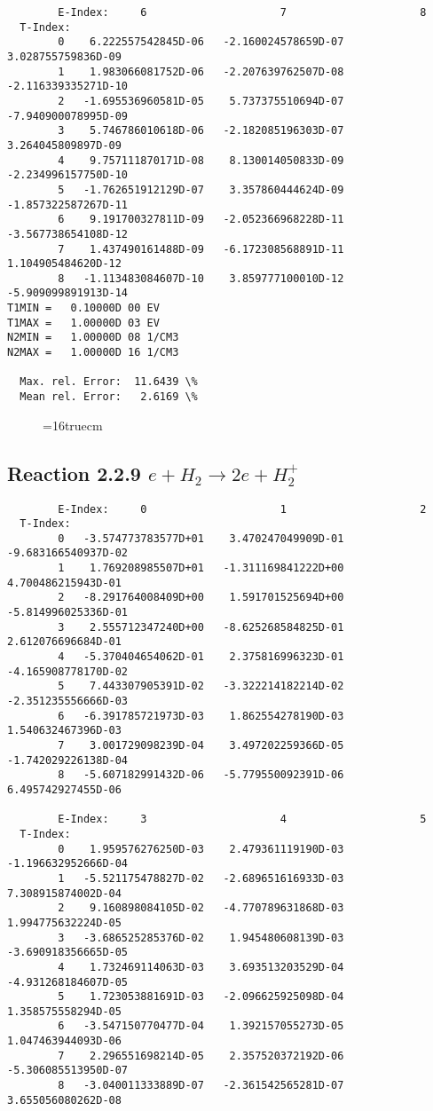 \documentclass[12pt,dvipdfmx]{article}
\begin{document}
{\begin{small}
\begin{verbatim}
        E-Index:     6                     7                     8
  T-Index:
        0    6.222557542845D-06   -2.160024578659D-07    3.028755759836D-09
        1    1.983066081752D-06   -2.207639762507D-08   -2.116339335271D-10
        2   -1.695536960581D-05    5.737375510694D-07   -7.940900078995D-09
        3    5.746786010618D-06   -2.182085196303D-07    3.264045809897D-09
        4    9.757111870171D-08    8.130014050833D-09   -2.234996157750D-10
        5   -1.762651912129D-07    3.357860444624D-09   -1.857322587267D-11
        6    9.191700327811D-09   -2.052366968228D-11   -3.567738654108D-12
        7    1.437490161488D-09   -6.172308568891D-11    1.104905484620D-12
        8   -1.113483084607D-10    3.859777100010D-12   -5.909099891913D-14
T1MIN =   0.10000D 00 EV
T1MAX =   1.00000D 03 EV
N2MIN =   1.00000D 08 1/CM3
N2MAX =   1.00000D 16 1/CM3

  Max. rel. Error:  11.6439 \%
  Mean rel. Error:   2.6169 \%
\end{verbatim}\end{small}
\begin{figure} \label{2.2.5g}
\epsfxsize=16truecm
\end{figure}
\newpage


\subsection{
Reaction 2.2.9  $  e + H_2       \rightarrow 2e + H_2^+  $
}



\begin{small}\begin{verbatim}
        E-Index:     0                     1                     2
  T-Index:
        0   -3.574773783577D+01    3.470247049909D-01   -9.683166540937D-02
        1    1.769208985507D+01   -1.311169841222D+00    4.700486215943D-01
        2   -8.291764008409D+00    1.591701525694D+00   -5.814996025336D-01
        3    2.555712347240D+00   -8.625268584825D-01    2.612076696684D-01
        4   -5.370404654062D-01    2.375816996323D-01   -4.165908778170D-02
        5    7.443307905391D-02   -3.322214182214D-02   -2.351235556666D-03
        6   -6.391785721973D-03    1.862554278190D-03    1.540632467396D-03
        7    3.001729098239D-04    3.497202259366D-05   -1.742029226138D-04
        8   -5.607182991432D-06   -5.779550092391D-06    6.495742927455D-06

        E-Index:     3                     4                     5
  T-Index:
        0    1.959576276250D-03    2.479361119190D-03   -1.196632952666D-04
        1   -5.521175478827D-02   -2.689651616933D-03    7.308915874002D-04
        2    9.160898084105D-02   -4.770789631868D-03    1.994775632224D-05
        3   -3.686525285376D-02    1.945480608139D-03   -3.690918356665D-05
        4    1.732469114063D-03    3.693513203529D-04   -4.931268184607D-05
        5    1.723053881691D-03   -2.096625925098D-04    1.358575558294D-05
        6   -3.547150770477D-04    1.392157055273D-05    1.047463944093D-06
        7    2.296551698214D-05    2.357520372192D-06   -5.306085513950D-07
        8   -3.040011333889D-07   -2.361542565281D-07    3.655056080262D-08


\end{verbatim}
\end{small}}
\end{document}
